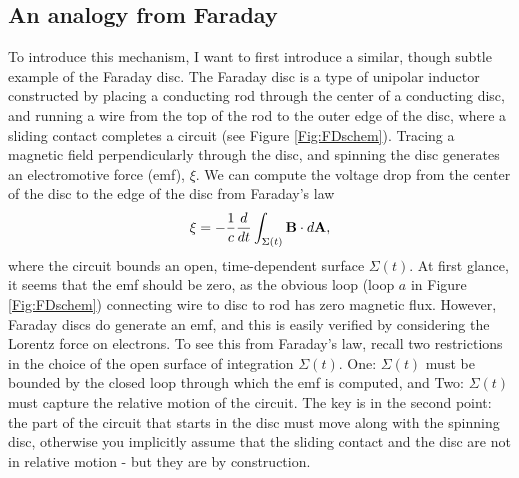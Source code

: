 \subsection{An analogy from Faraday}
To introduce this mechanism, I want to first introduce a similar, though
subtle example of the Faraday disc. The Faraday disc is a type of unipolar
inductor constructed by placing a conducting rod through the center of a
conducting disc, and running a wire from the top of the rod to the outer edge
of the disc, where a sliding contact completes a circuit (see Figure
\ref{Fig:FDschem}). Tracing a magnetic field perpendicularly through the disc,
and spinning the disc generates an electromotive force (emf), $\xi$. We can compute
the voltage drop from the center of the disc to the edge of the disc from
Faraday's law
\begin{align} 
\xi = - \frac{1}{c}\frac{d}{dt}\int_{\Sigma(t)}{{\bf B} \cdot d{\bf A}}, 
\end{align} 
where the circuit bounds an open, time-dependent surface $\Sigma(t)$. At first
glance, it seems that the emf should be zero, as the obvious loop (loop $a$ in
Figure \ref{Fig:FDschem}) connecting wire to disc to rod has zero magnetic
flux. However, Faraday discs do generate an emf, and this is easily verified
by considering the Lorentz force on electrons. To see this from Faraday's law, recall two restrictions in the
choice of the open surface of integration $\Sigma(t)$. One: $\Sigma(t)$ must be bounded by the closed loop through which the emf is computed, and Two: $\Sigma(t)$ must capture the relative motion of the circuit.
The key is in the second point: the part of the circuit that starts in the
disc must move along with the spinning disc, otherwise you implicitly assume
that the sliding contact and the disc are not in relative motion - but they
are by construction.


